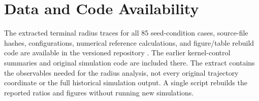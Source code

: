 \section*{Data and Code Availability}
The extracted terminal radius traces for all 85 seed-condition cases,
source-file hashes, configurations, numerical reference calculations,
and figure/table rebuild code are available in the versioned repository
\cite{PaperIEvidence2026}. The earlier kernel-control summaries and original
simulation code are included there. The extract contains the observables
needed for the radius analysis, not every original trajectory coordinate
or the full historical simulation output. A single script rebuilds the
reported ratios and figures without running new simulations.
